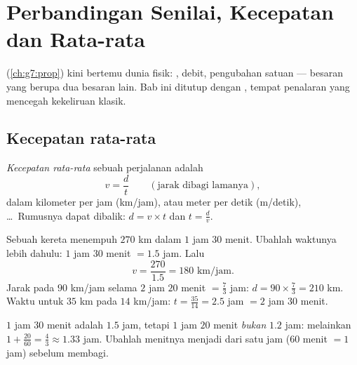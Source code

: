 \chapter{Perbandingan Senilai, Kecepatan dan Rata-rata}\label{ch:g8:speed}

 (\cref{ch:g7:prop}) kini bertemu dunia fisik:
, debit, pengubahan satuan --- besaran yang berupa
\emph{} dua besaran lain. Bab ini ditutup dengan , tempat penalaran yang  mencegah kekeliruan klasik.

\section{Kecepatan rata-rata}

\begin{definition}\label{def:g8:speed:def}
\emph{Kecepatan rata-rata} sebuah perjalanan adalah 
\[
v = \frac{d}{t}
\qquad
\left(\text{jarak dibagi lamanya}\right),
\]
dalam kilometer per jam (km/jam), atau meter per detik (m/detik),
\dots\ Rumusnya dapat dibalik: $d = v \times t$ dan $t = \frac{d}{v}$.
\end{definition}

\begin{example}\label{ex:g8:speed:basic}
Sebuah kereta menempuh $270$ km dalam $1$ jam $30$ menit. Ubahlah
waktunya lebih dahulu: $1$ jam $30$ menit $= 1.5$ jam. Lalu
\[
v = \frac{270}{1.5} = 180 \text{ km/jam}.
\]
Jarak pada $90$ km/jam selama $2$ jam $20$ menit $= \frac73$ jam:
$d = 90 \times \frac73 = 210$ km. Waktu untuk $35$ km pada
$14$ km/jam: $t = \frac{35}{14} = 2.5$ jam $= 2$ jam $30$ menit.
\end{example}

\begin{remark}
$1$ jam $30$ menit adalah $1.5$ jam, tetapi $1$ jam $20$ menit
\emph{bukan} $1.2$ jam: melainkan $1 + \frac{20}{60} = \frac43 \approx
1.33$ jam. Ubahlah menitnya menjadi  dari satu jam
($60$ menit $= 1$ jam) sebelum membagi.
\end{remark}


